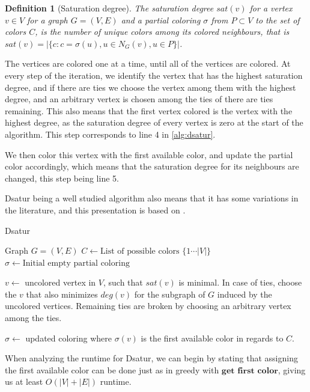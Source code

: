 \documentclass[a4paper]{article}
\newtheorem{definition}{Definition}[section]
\begin{document}
\begin{definition}[Saturation degree]{\cite{Constructive}}
    The saturation degree $sat(v)$ for a vertex $v \in V$ for a graph $G =
    (V,E)$ and a partial coloring $\sigma$ from $P \subset V$ to the set of colors $C$, is the number of unique colors among
    its colored neighbours, that is $sat(v) = |\{c  : c = \sigma(u), u \in N_G(v),u \in P  \}|$.
\end{definition}

The vertices are colored one at a time, until all of the vertices are colored.
At every step of the iteration, we identify the vertex that has the highest
saturation degree, and if there are ties we choose the vertex among them with
the highest degree, and an arbitrary vertex is chosen among the ties of there
are ties remaining.  This also means that the first vertex colored is the
vertex with the highest degree, as the saturation degree of every vertex is
zero at the start of the algorithm. This step corresponds to line 4 in 
\autoref{alg:dsatur}.

We then color this vertex with the first available
color, and update the partial color accordingly, which means that the
saturation degree for its neighbours are changed, this step being line 5.

Dsatur being a well studied
algorithm also means that it has some variations in the literature, and this
presentation is based on \cite{Constructive}.
\begin{algorithm}[H]
  \caption{Dsatur}
    \label{alg:dsatur}
  \begin{algorithmic}[1]
      \REQUIRE Graph $G = (V,E)$
      \STATE $C \leftarrow \text{List of possible colors $\{1 \cdots |V| \}$ }$
      \STATE $\sigma \leftarrow \text{Initial empty partial coloring}$
      

        \STATE $v \leftarrow$ uncolored vertex in $V$, such that $sat(v)$ is
        minimal. In case of ties, choose the $v$ that also minimizes $deg(v)$
        for the subgraph of $G$ induced by the uncolored vertices. Remaining
        ties are broken by choosing an arbitrary vertex among the ties.

        \STATE $\sigma \leftarrow$ updated coloring where $\sigma(v)$ is the first
        available color in regards to $C$.
      \ENDWHILE
  \end{algorithmic}
\end{algorithm}
When analyzing the runtime for Dsatur, we can begin by stating that
assigning the first available color can be done just as in greedy with
$\textbf{get first color}$, giving us at least $O(|V|+|E|)$ runtime. 
\end{document}
